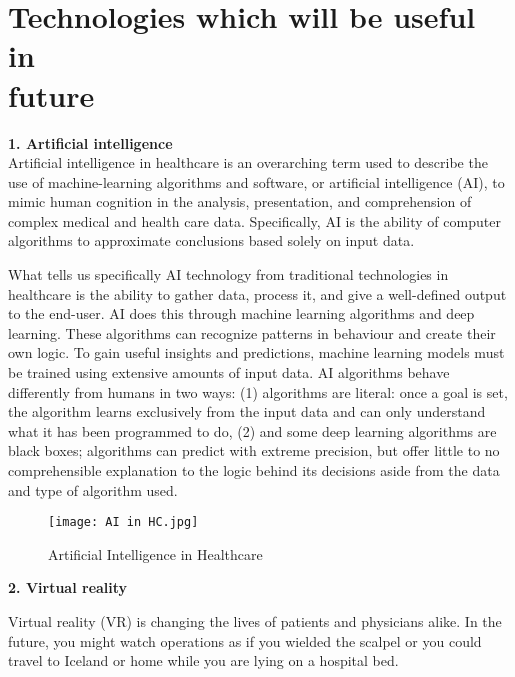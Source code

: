\documentclass[12pt,a4paper]{article}
\begin{document}
\clearpage

\section{Technologies which will be useful in\\future}



\textbf{1. Artificial intelligence}\\



Artificial intelligence in healthcare is an overarching term used to describe the use of machine-learning algorithms and software, or artificial intelligence (AI), to mimic human cognition in the analysis, presentation, and comprehension of complex medical and health care data. Specifically, AI is the ability of computer algorithms to approximate conclusions based solely on input data.

What tells us specifically AI technology from traditional technologies in healthcare is the ability to gather data, process it, and give a well-defined output to the end-user. AI does this through machine learning algorithms and deep learning. These algorithms can recognize patterns in behaviour and create their own logic. To gain useful insights and predictions, machine learning models must be trained using extensive amounts of input data. AI algorithms behave differently from humans in two ways: (1) algorithms are literal: once a goal is set, the algorithm learns exclusively from the input data and can only understand what it has been programmed to do, (2) and some deep learning algorithms are black boxes; algorithms can predict with extreme precision, but offer little to no comprehensible explanation to the logic behind its decisions aside from the data and type of algorithm used.

\begin{figure}[h]
\centering
\texttt{[image: AI in HC.jpg]}
\caption{Artificial Intelligence in Healthcare}
\end{figure}



\textbf{2. Virtual reality}

\hspace{1cm}

Virtual reality (VR) is changing the lives of patients and physicians alike. In the future, you might watch operations as if you wielded the scalpel or you could travel to Iceland or home while you are lying on a hospital bed. 
\end{document}
